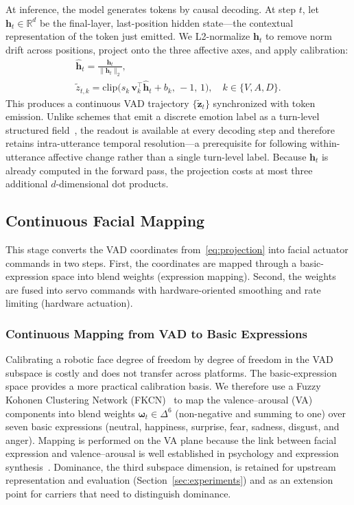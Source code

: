 \documentclass[letterpaper, 10 pt, conference]{ieeeconf/ieeeconf}
\begin{document}
At inference, the model generates tokens by causal decoding.
At step $t$, let $\mathbf{h}_t \in \mathbb{R}^{d}$ be the final-layer, last-position hidden state---the contextual representation of the token just emitted.
We L2-normalize $\mathbf{h}_t$ to remove norm drift across positions, project onto the three affective axes, and apply calibration:
\begin{equation}
\begin{gathered}
    \hat{\mathbf{h}}_t = \frac{\mathbf{h}_t}{\|\mathbf{h}_t\|_2}, \\[2pt]
    \tilde{z}_{t,k} = \mathrm{clip}\bigl(s_k\,\mathbf{v}_k^\top\hat{\mathbf{h}}_t + b_k,\,-1,\,1\bigr),
    \quad k \in \{V, A, D\}.
\end{gathered}
\label{eq:projection}
\end{equation}
This produces a continuous VAD trajectory $\{\tilde{\mathbf{z}}_t\}$ synchronized with token emission.
Unlike schemes that emit a discrete emotion label as a turn-level structured field~\cite{mishra2023realtime}, the readout is available at every decoding step and therefore retains intra-utterance temporal resolution---a prerequisite for following within-utterance affective change rather than a single turn-level label.
Because $\mathbf{h}_t$ is already computed in the forward pass, the projection costs at most three additional $d$-dimensional dot products.

\subsection{Continuous Facial Mapping}
\label{sec:actuator}

This stage converts the VAD coordinates from~\eqref{eq:projection} into facial actuator commands in two steps. First, the coordinates are mapped through a basic-expression space into blend weights (expression mapping). Second, the weights are fused into servo commands with hardware-oriented smoothing and rate limiting (hardware actuation).

\subsubsection{Continuous Mapping from VAD to Basic Expressions}
Calibrating a robotic face degree of freedom by degree of freedom in the VAD subspace is costly and does not transfer across platforms. The basic-expression space provides a more practical calibration basis.
We therefore use a Fuzzy Kohonen Clustering Network (FKCN)~\cite{han2010fkcn} to map the valence--arousal (VA) components into blend weights $\boldsymbol{\omega}_t \in \Delta^{6}$ (non-negative and summing to one) over seven basic expressions (neutral, happiness, surprise, fear, sadness, disgust, and anger).
Mapping is performed on the VA plane because the link between facial expression and valence--arousal is well established in psychology and expression synthesis~\cite{russell1980circumplex,breazeal2002designing}. Dominance, the third subspace dimension, is retained for upstream representation and evaluation (Section~\ref{sec:experiments}) and as an extension point for carriers that need to distinguish dominance.
\end{document}
